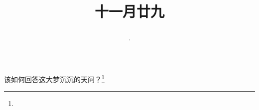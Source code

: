 \title{\date[d=29,m=12,y=2024][year:cn-y,年,month:cn,day:cn,日,·,weekday]·十一月廿九 }
该如何回答这大梦沉沉的天问？\footnote{ }

